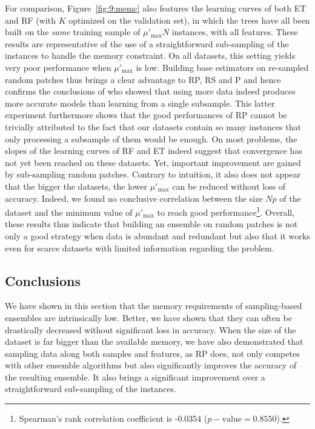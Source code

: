 For comparison, Figure~\ref{fig:9:memc} also features the learning curves of both
ET and RF (with $K$ optimized on the validation set), in which the trees have
all been built on the {\it same} training sample of $\mu'_{\text{max}}N$ instances,
with all features. These results are representative of the use of a
straightforward sub-sampling of the instances to handle the memory constraint.
On all datasets, this setting yields very poor performance when $\mu'_{\text{max}}$ is
low. Building base estimators on re-sampled random patches thus brings a clear advantage to RP, RS and P and hence confirms the conclusions of \citet{basilico:2011} who showed that using more data indeed produces
more accurate models than learning from a single subsample.
This
latter experiment furthermore shows that the good performances of RP
cannot be trivially attributed to the fact that our datasets contain so many
instances that only processing a subsample of them would be enough. On most
problems, the slopes of the learning curves of RF and ET indeed suggest that
convergence has not yet been reached on these datasets. Yet, important
improvement are gained by sub-sampling random patches.
Contrary to intuition, it
also does not appear that the bigger the datasets, the lower $\mu'_{\text{max}}$ can be
reduced without loss of accuracy. Indeed, we found no conclusive correlation
between the size $Np$ of the dataset and the minimum value of $\mu'_{\text{max}}$ to
reach good performance\footnote{Spearman's rank correlation coefficient is
-0.0354 ($p-\mathrm{value}=0.8550$).}.
Overall, these results thus indicate that
building an ensemble on random patches is not only a good strategy when data is
abundant and redundant but also that it works even for scarce datasets with
limited information regarding the problem.

\subsection{Conclusions}

We have shown in this section that the memory requirements of sampling-based
ensembles are intrinsically low. Better, we have shown that they can often be
drastically decreased without significant loss in accuracy. When the size of the
dataset is far bigger than the available memory, we have also demonstrated that
sampling data along both samples and features, as RP does, not only competes
with other ensemble algorithms but also significantly improves the accuracy of
the resulting ensemble. It also brings a significant improvement over a
straightforward sub-sampling of the instances.

